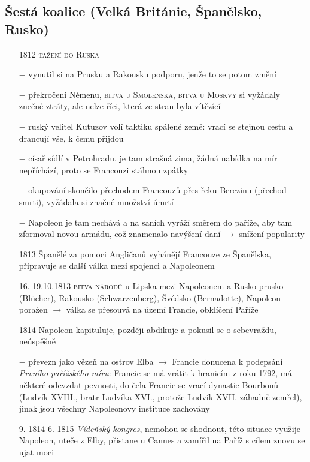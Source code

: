 \documentclass{article}
\begin{document}
\subsection*{Šestá koalice (Velká Británie, Španělsko, Rusko)}
\begin{itemize}
    \vspace{-0.5em}
    \setlength\itemsep{0.15em}
    \item[1812] \textsc{tažení do Ruska}
    \item[$-$] vynutil si na Prusku a Rakousku podporu, jenže to se potom změní
    \item[$-$] překročení Němenu, \textsc{bitva u Smolenska}, \textsc{bitva u Moskvy} si vyžádaly znečné ztráty, ale nelze říci, která ze stran byla vítězící
    \item[$-$] ruský velitel Kutuzov volí taktiku spálené země: vrací se stejnou cestu a drancují vše, k čemu přijdou
    \item[$-$] císař sídlí v Petrohradu, je tam strašná zima, žádná nabídka na mír nepříchází, proto se Francouzi stáhnou zpátky
    \item[$-$] okupování skončilo přechodem Francouzů přes řeku Berezinu (přechod smrti), vyžádala si značné množství úmrtí
    \item[$-$] Napoleon je tam nechává a na saních vyráží směrem do paříže, aby tam zformoval novou armádu, což znamenalo navýšení daní $\rightarrow$ snížení popularity
    \item[1813] Španělé za pomoci Angličanů vyhánějí Francouze ze Španělska, připravuje se další válka mezi spojenci a Napoleonem
    \item[16.-19.10.1813] \textsc{bitva národů} u Lipska mezi Napoleonem a Rusko-prusko (Blücher), Rakousko (Schwarzenberg), Švédsko (Bernadotte), Napoleon poražen $\rightarrow$ válka se přesouvá na území Francie, obklíčení Paříže
    \item[1814] Napoleon kapituluje, později abdikuje a pokusil se o sebevraždu, neúspěšně
    \item[$-$] převezn jako vězeň na ostrov Elba $\rightarrow$ Francie donucena k podepsání \textit{Prvního pařížského míru}: Francie se má vrátit k hranicím z roku 1792, má některé odevzdat pevnosti, do čela Francie se vrací dynastie Bourbonů (Ludvík XVIII., bratr Ludvíka XVI., protože Ludvík XVII. záhadně zemřel), jinak jsou všechny Napoleonovy instituce zachovány
    \item[9. 1814-6. 1815] \textit{Vídeňský kongres}, nemohou se shodnout, této situace využije Napoleon, uteče z Elby, přistane u Cannes a zamířil na Paříž s cílem znovu se ujat moci

\end{itemize}
\end{document}
